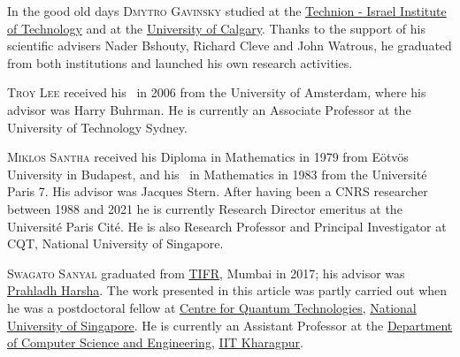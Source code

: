 \documentclass{toc}
\begin{document}
\begin{tocaboutauthors}
\begin{tocabout}[Gavinsky]
 In the good old days \textsc{Dmytro Gavinsky} studied at the 
\href{www.cs.technion.ac.il}{Technion - Israel Institute of
Technology} and at the 
\href{https://science.ucalgary.ca/computer-science}{University of Calgary}. 
Thanks to the support of his scientific advisers 
Nader Bshouty, Richard Cleve and John Watrous, he graduated from
both institutions and launched his own research activities.
\end{tocabout}
\begin{tocabout}[Lee]
\textsc{Troy Lee} received his \phd\ in 2006 from the 
University of Amsterdam, where his advisor was Harry Buhrman.
He is currently an Associate Professor at the University of Technology Sydney.
\end{tocabout}
\begin{tocabout}[Santha]
\textsc{Miklos Santha} received his Diploma in Mathematics in 1979 
from E\"{o}tv\"{o}s University in Budapest, and his \phd\ in Mathematics 
in 1983 from the Universit\'{e} Paris 7. His advisor was Jacques Stern. 
After having been a CNRS researcher between 1988 and 2021 he is currently 
Research Director emeritus at the Universit\'{e} Paris Cit\'{e}. He is 
also Research Professor and Principal Investigator at CQT, National 
University of Singapore. 
\end{tocabout}
\begin{tocabout}[Sanyal]
\textsc{Swagato Sanyal} graduated from \href{www.tifr.res.in}{TIFR}, Mumbai 
in 2017; his advisor was 
\href{https://www.tifr.res.in/~prahladh/}{Prahladh Harsha}. 
The work presented in this article was partly carried out when he was a
%
postdoctoral %
fellow at \href{https://www.quantumlah.org/}{Centre for Quantum Technologies},
\href{https://www.nus.edu.sg/}{National University of Singapore}. He is 
currently an Assistant Professor at the 
\href{http://cse.iitkgp.ac.in/}{Department of Computer Science and Engineering},
\href{www.iitkgp.ac.in}{IIT Kharagpur}.
\end{tocabout}
\end{tocaboutauthors}
\end{document}
